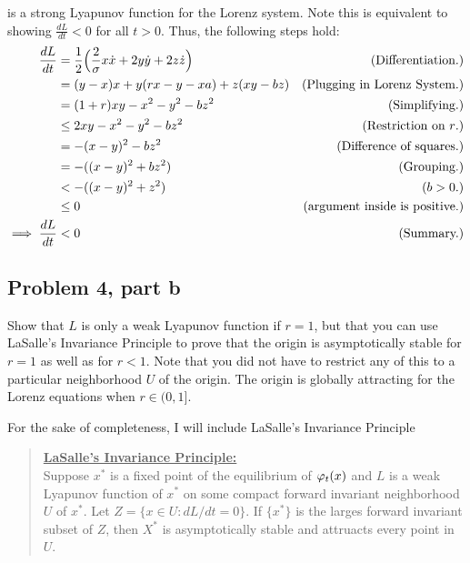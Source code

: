 \begin{solution}
is a strong Lyapunov function for the Lorenz system. Note this is equivalent to showing $\frac{dL}{dt} < 0$ for all $t > 0$. Thus, the following steps hold:
\alignbreak
\begin{align}
    \frac{dL}{dt} &= \frac{1}{2}\Big( \frac{2}{\sigma}x\dot{x} + 2y\dot{y} + 2z\dot{z} \Big)&\text{(Differentiation.)}\nonumber\\
    &= (y - x)x + y(rx - y - xa) + z(xy - bz) &\text{(Plugging in Lorenz System.)}\nonumber\\
    &= (1 + r) xy - x^2 - y^2 - bz^2 &\text{(Simplifying.)}\nonumber\\
    &\leq 2xy - x^2 - y^2 - bz^2 &\text{(Restriction on $r$.)}\nonumber\\
    &= -(x - y)^2 - bz^2 &\text{(Difference of squares.)}\nonumber\\
    &= -((x - y)^2 + bz^2) &\text{(Grouping.)}\nonumber\\
    &< -((x - y)^2 + z^2) &(b > 0.)\nonumber\\
    &\leq 0 &\text{(argument inside is positive.)}\nonumber\\
\implies \frac{dL}{dt} &< 0 &\text{(Summary.)}\nonumber
\end{align}
\alignbreak
\end{solution}

\newpage
\subsection{Problem 4, part b}
Show that $L$ is only a weak Lyapunov function if $r = 1$, but that you can use LaSalle's Invariance Principle to prove that the origin is asymptotically stable for $r = 1$ as well as for $r < 1$. Note that you did not have to restrict any of this to a particular neighborhood $U$ of the origin. The origin is globally attracting for the Lorenz equations when $r \in (0, 1]$.

\partbreak
\begin{solution}

    For the sake of completeness, I will include LaSalle's Invariance Principle
    \begin{quote}
        \underline{\textbf{LaSalle's Invariance Principle:}} \\
        Suppose $x^*$ is a fixed point of the equilibrium of $\varphi_t(x)$ and $L$ is a weak Lyapunov function of $x^*$ on some compact forward invariant neighborhood $U$ of $x^*$. Let $Z = \{x \in U : dL/dt = 0\}$. If $\{x^*\}$ is the larges forward invariant subset of $Z$, then $X^*$ is asymptotically stable and attruacts every point in $U$.
    \end{quote}
\end{solution}

